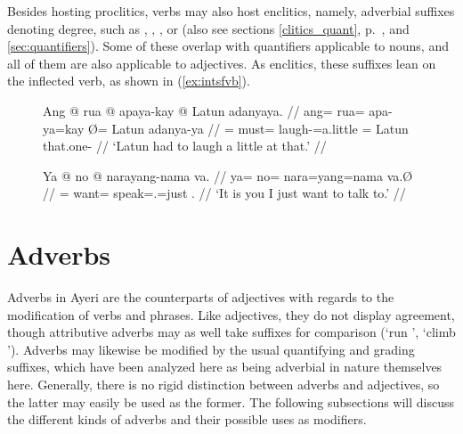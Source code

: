 Besides hosting proclitics, verbs may also host enclitics, namely,
adverbial suffixes denoting degree, such as
,
,
, or
(also see sections \ref{clitics_quant}, p.~\pageref{clitics_quant}, and
\ref{sec:quantifiers}). Some of these overlap with quantifiers
applicable to nouns, and all of them are also applicable to adjectives. As
enclitics, these suffixes lean on the inflected verb, as shown in 
(\ref{ex:intsfvb}).

\begin{figure}[h]
\pex\label{ex:intsfvb}
\a\label{ex:verbquant}\begingl
	\gla Ang @ rua @ apaya-kay {} @ Latun adanyaya. //
	\glb ang= rua= apa-ya=kay Ø= Latun adanya-ya //
	\glc \AgtT{}= must= laugh-\TsgM{}=a.little \Top{}= Latun that.one-\Loc{} //
	\glft `Latun had to laugh a little at that.' //
\endgl

\a\begingl
	\gla Ya @ no @ narayang-nama va. //
	\glb ya= no= nara=yang=nama va.Ø //
	\glc \LocT{}= want= speak=\Fsg{}.\Aarg{}=just \Second{}.\Top{} //
	\glft `It is you I just want to talk to.' //
\endgl
\xe
\end{figure}


\section{Adverbs}
\label{sec:adverbs}

Adverbs in Ayeri are the counterparts of adjectives with regards to the
modification of verbs and phrases. Like adjectives, they do not display
agreement, though attributive adverbs may as well take suffixes for comparison
(`run ', `climb '). Adverbs may likewise be modified by
the usual quantifying and grading suffixes, which have been analyzed here as
being adverbial in nature themselves here. Generally, there is no rigid
distinction between adverbs and adjectives, so the latter may easily be used as
the former. The following subsections will discuss the different kinds of
adverbs and their possible uses as modifiers.

